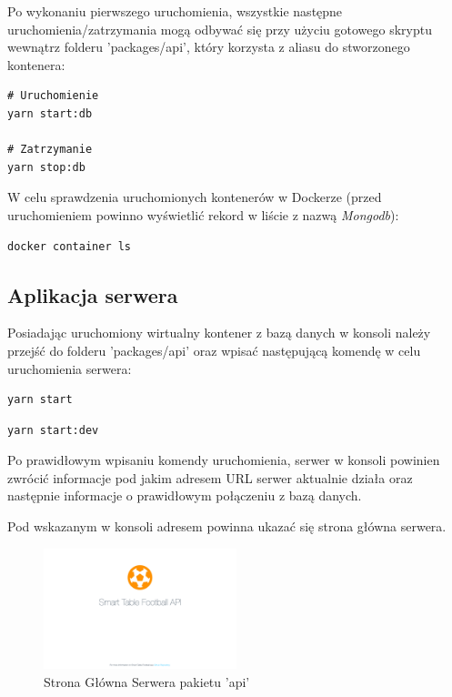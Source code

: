 Po wykonaniu pierwszego uruchomienia, wszystkie następne uruchomienia/zatrzymania mogą odbywać się przy użyciu gotowego skryptu wewnątrz folderu 'packages/api', który korzysta z aliasu do stworzonego kontenera:

\begin{lstlisting}[caption={Uruchamianie/zatrzymywanie bazy daych z użyciem skryptu w pakiecie api}]
# Uruchomienie
yarn start:db

# Zatrzymanie
yarn stop:db
\end{lstlisting}

W celu sprawdzenia uruchomionych kontenerów w Dockerze (przed uruchomieniem powinno wyświetlić rekord w liście z nazwą \textit{Mongodb}):

\begin{lstlisting}[caption={Wylistowanie uruchomionych kontenerów dockera}]
docker container ls
\end{lstlisting}

\subsection{Aplikacja serwera}

Posiadając uruchomiony wirtualny kontener z bazą danych w konsoli należy przejść do folderu 'packages/api' oraz wpisać następującą komendę w celu uruchomienia serwera:

\begin{lstlisting}[caption={Uruchamianie serwera w pakiecie api}]
yarn start
\end{lstlisting}

\begin{lstlisting}[caption={Uruchamianie serwera w pakiecie api w trybie śledzenia zmian}]
yarn start:dev
\end{lstlisting}

Po prawidłowym wpisaniu komendy uruchomienia, serwer w konsoli powinien zwrócić informacje pod jakim adresem URL serwer aktualnie działa oraz następnie informacje o prawidłowym połączeniu z bazą danych.


Pod wskazanym w konsoli adresem powinna ukazać się strona główna serwera.

\begin{figure}[h!]
  \centering
    \includegraphics[width=0.5\textwidth]{images/api/stf_api_home.png}
  \caption{Strona Główna Serwera pakietu 'api'}
  \label{fig:mobile}
\end{figure}


